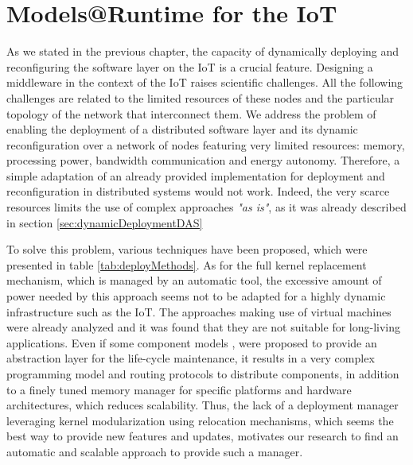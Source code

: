\chapter{Models@Runtime for the IoT}
\label{ch:MARContiki}

As we stated in the previous chapter, the capacity of dynamically deploying and reconfiguring the software layer on the IoT is a crucial feature.
Designing a middleware in the context of the IoT raises scientific challenges.
All the following challenges are related to the limited resources of these nodes and the particular topology of the network that interconnect them.
We address the problem of enabling the deployment of a distributed software layer and its dynamic reconfiguration over a network of nodes featuring very limited resources: memory, processing power, bandwidth communication and energy autonomy.
Therefore, a simple adaptation of an already provided implementation for deployment and reconfiguration in distributed systems would not work.
Indeed, the very scarce resources limits the use of complex approaches \textit{"as is"}, as it was already described in section \ref{sec:dynamicDeploymentDAS}

To solve this problem, various techniques have been proposed, which were presented in table \ref{tab:deployMethods}. 
As for the full kernel replacement mechanism, which is managed by an automatic tool\cite{hui2004dynamic}, the excessive amount of power needed by this approach seems not to be adapted for a highly dynamic infrastructure such as the IoT.
The approaches making use of virtual machines were already analyzed and it was found that they are not suitable for long-living applications\cite{oliver2014reprogramming}.
Even if some component models \cite{mottola2008figaro}, \cite{taherkordi2013optimizing} were proposed to provide an abstraction layer for the life-cycle maintenance, it results in a very complex programming model and routing protocols to distribute components, in addition to a finely tuned memory manager for specific platforms and hardware architectures, which reduces scalability.
Thus, the lack of a deployment manager leveraging kernel modularization using relocation mechanisms, which seems the best way to provide new features and updates, motivates our research to find an automatic and scalable approach to provide such a manager.


